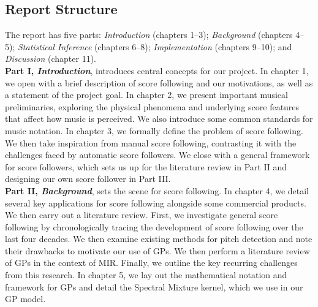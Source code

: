 
\subsection*{\centering Report Structure}

The report has five parts: \textit{Introduction} (chapters 1–3); \textit{Background} (chapters 4–5);  \textit{Statistical Inference} (chapters 6–8);  \textit{Implementation} (chapters 9–10); and  \textit{Discussion} (chapter 11). \\

\textbf{Part I, \textit{Introduction}}, introduces central concepts for our project. In chapter 1, we open with a brief description of score following and our motivations, as well as a statement of the project goal. In chapter 2, we present important musical preliminaries, exploring the physical phenomena and underlying score features that affect how music is perceived. We also introduce some common standards for music notation. In chapter 3, we formally define the problem of score following. We then take inspiration from manual score following, contrasting it with the challenges faced by automatic score followers. We close with a general framework for score followers, which sets us up for the literature review in Part II and designing our own score follower in Part III.   \\

\textbf{Part II, \textit{Background}}, sets the scene for score following. In chapter 4, we detail several key applications for score following alongside some commercial products. We then carry out a literature review. First, we investigate general score following by chronologically tracing the development of score following over the last four decades. We then examine existing methods for pitch detection and note their drawbacks to motivate our use of GPs. We then perform a literature review of GPs in the context of MIR. Finally, we outline the key recurring challenges from this research. In chapter 5, we lay out the mathematical notation and framework for GPs and detail the Spectral Mixture kernel, which we use in our GP model. \\

